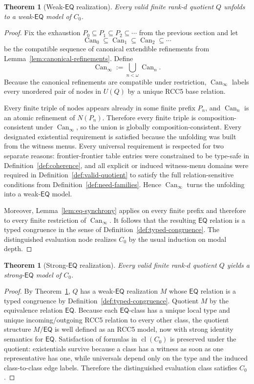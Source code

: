 \documentclass[11pt]{article}
\newtheorem{theorem}[definition]{Theorem}
\theoremstyle{remark}
\newcommand{\EQ}{\mathsf{EQ}}
\newcommand{\cl}{\operatorname{cl}}
\newcommand{\Can}{\operatorname{Can}}
\begin{document}
\begin{theorem}[Weak-$\EQ$ realization]\label{thm:weak-model}
Every valid finite rank-$d$ quotient $Q$ unfolds to a weak-$\EQ$ model of $C_0$.
\end{theorem}

\begin{proof}
Fix the exhaustion $P_0\subseteq P_1\subseteq P_2\subseteq\cdots$ from the previous section and let
\[
\Can_0\subseteq \Can_1\subseteq \Can_2\subseteq\cdots
\]
be the compatible sequence of canonical extendible refinements from Lemma~\ref{lem:canonical-refinements}. Define
\[
\Can_\infty:=\bigcup_{n<\omega}\Can_n.
\]
Because the canonical refinements are compatible under restriction, $\Can_\infty$ labels every unordered pair of nodes in $U(Q)$ by a unique RCC5 base relation.

Every finite triple of nodes appears already in some finite prefix $P_n$, and $\Can_n$ is an atomic refinement of $N(P_n)$. Therefore every finite triple is composition-consistent under $\Can_\infty$, so the union is globally composition-consistent. Every designated existential requirement is satisfied because the unfolding was built from the witness menus. Every universal requirement is respected for two separate reasons: frontier-frontier table entries were constrained to be type-safe in Definition~\ref{def:coherence}, and all explicit or induced witness-menu domains were required in Definition~\ref{def:valid-quotient} to satisfy the full relation-sensitive conditions from Definition~\ref{def:need-families}. Hence $\Can_\infty$ turns the unfolding into a weak-$\EQ$ model.

Moreover, Lemma~\ref{lem:eq-synchrony} applies on every finite prefix and therefore to every finite restriction of $\Can_\infty$. It follows that the resulting $\EQ$ relation is a typed congruence in the sense of Definition~\ref{def:typed-congruence}. The distinguished evaluation node realizes $C_0$ by the usual induction on modal depth.
\end{proof}

\begin{theorem}[Strong-$\EQ$ realization]\label{thm:strong-model}
Every valid finite rank-$d$ quotient $Q$ yields a strong-$\EQ$ model of $C_0$.
\end{theorem}

\begin{proof}
By Theorem~\ref{thm:weak-model}, $Q$ has a weak-$\EQ$ realization $M$ whose $\EQ$ relation is a typed congruence by Definition~\ref{def:typed-congruence}. Quotient $M$ by the equivalence relation $\EQ$. Because each $\EQ$-class has a unique local type and unique incoming/outgoing RCC5 relation to every other class, the quotient structure $M/{\EQ}$ is well defined as an RCC5 model, now with strong identity semantics for $\EQ$. Satisfaction of formulas in $\cl(C_0)$ is preserved under the quotient: existentials survive because a class has a witness as soon as one representative has one, while universals depend only on the type and the induced class-to-class edge labels. Therefore the distinguished evaluation class satisfies $C_0$.
\end{proof}
\end{document}
